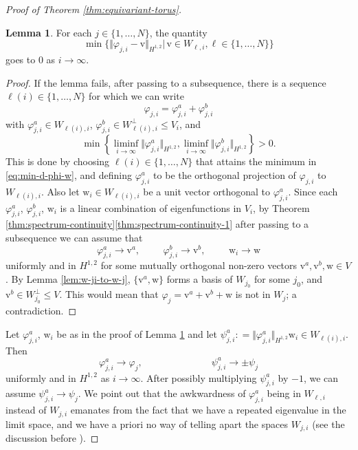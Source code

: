 \documentclass[12pt]{amsart}
\theoremstyle{definition}
\def\fnum{equation}
\newtheorem{lemma}[\fnum]{Lemma}
\numberwithin{equation}{section}
\newcommand{\vv}{\text{v}}
\newcommand{\ww}{\text{w}}
\newcommand{\sobo}{H^{1,2}}
\begin{document}
\begin{proof}[Proof of Theorem \ref{thm:equivariant-torus}]
\begin{lemma}\label{lem:min-d-phi-w}
    For each $j \in \{ 1, \ldots , N \}$, the quantity 
    \begin{equation}\label{eq:min-d-phi-w}
        \min  \{  \Vert \varphi_{j,i} - \vv \Vert _{\sobo } \vert \,  \vv \in W_{\ell, i} , \ell \in \{ 1, \ldots , N \}  \} 
    \end{equation}    
    goes to $0$ as $i \to \infty$.
\end{lemma}
\begin{proof}
    If the lemma fails, after passing to a subsequence, there is a sequence $\ell (i) \in \{ 1, \ldots , N \} $ for which we can write 
    \[   \varphi_{j,i} =  \varphi_{j,i}^a + \varphi_{j,i}^b                              \]
    with $\varphi_{j,i}^a \in W_{\ell (i) ,i}$, $\varphi_{j,i}^b \in W_{\ell (i), i}^{\perp} \leq V_i$, and 
     \[ \min \left\{   \liminf_{i \to \infty}    \Vert \varphi_{j,i} ^a \Vert_{\sobo} , \liminf_{i \to \infty}  \Vert \varphi_{j,i}^b \Vert_{\sobo } \right\}  > 0 .  \]
     This is done by choosing $\ell (i) \in \{ 1, \ldots, N \} $ that attains the minimum in  \eqref{eq:min-d-phi-w}, and defining  $\varphi_{j,i}^a$ to be the orthogonal projection of $\varphi_{j,i}$ to $W_{\ell (i),i}$. Also let $\ww _ i \in W_{\ell (i), i} $ be a unit vector orthogonal to $\varphi_{j,i}^a$. Since each $\varphi_{j,i}^a$, $\varphi_{j,i}^b$, $\ww_i$ is a linear combination of eigenfunctions in $V_i$, by Theorem \ref{thm:spectrum-continuity}\eqref{thm:spectrum-continuity-1} after passing to a subsequence we can assume that 
     \[     \varphi_{j,i}^a \to \vv^a ,  \hspace{1cm} \varphi_{j,i}^b \to \vv^b , \hspace{1cm} \ww _i \to \ww     \]
     uniformly and in $\sobo$ for some mutually orthogonal non-zero vectors $\vv^a, \vv^b, \ww \in V$.  By Lemma \ref{lem:w-ji-to-w-j}, $\{ \vv ^a , \ww \}$ forms a basis of $W_{j_0}$ for some $j_0$, and $\vv ^b \in W_{j_0} ^{\perp} \leq V$. This would mean that $\varphi_j = \vv ^a + \vv ^b + \ww$ is not in  $W_{j}$; a contradiction. 
\end{proof}

Let $\varphi_{j,i}^a$, $\ww _i$ be as in the proof of Lemma \ref{lem:min-d-phi-w} and let $\psi _{j,i } ^a : = \Vert \varphi_{j,i} ^a \Vert _{\sobo} \ww _i \in W_{\ell (i) , i } $. Then
\[      \varphi_{j,i}^a \to \varphi_j , \hspace{3cm} \psi _{j,i}^a \to \pm \psi_{j}       \]
uniformly and in $\sobo$ as $i \to \infty$. After possibly multiplying $\psi_{j,i}^a$ by $-1$, we can assume $\psi_{j,i}^a \to \psi_j$. We point out that the awkwardness of $\varphi_{j,i}^a$ being in $W_{\ell, i}$ instead of $W_{j,i}$ emanates from the fact that we have a repeated eigenvalue in the limit space, and we have a priori  no way of telling apart the spaces $W_{j,i}$ (see the discussion before \cite[Theorem 7.3]{cheeger-colding-iii}). 


\end{proof}
\end{document}
